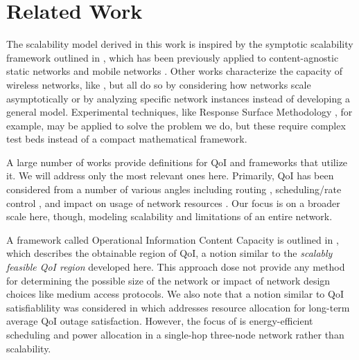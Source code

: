 \section{Related Work}
\label{sec:related_work}

The scalability model derived in this work is inspired by the symptotic scalability framework outlined in \cite{symptotics_journal}, which has been previously applied to content-agnostic static networks \cite{symptotics_framework_scalability} and mobile networks \cite{scal_analysis_mobility}.  Other works characterize the capacity of wireless networks, like \cite{li_capacity, gupta2000capacity}, but all do so by considering how networks scale asymptotically or by analyzing specific network instances instead of developing a general model.  Experimental techniques, like Response Surface Methodology \cite{khuri2010response}, for example, may be applied to solve the problem we do, but these require complex test beds instead of a compact mathematical framework.

A large number of works provide definitions for QoI and frameworks that utilize it.  We will address only the most relevant ones here.  Primarily, QoI has been considered from a number of various angles including routing \cite{quality_aware_routing_tan}, scheduling/rate control \cite{toward_qoi_rate_control,explor_vs_exploit}, and impact on usage of network resources \cite{qoi_aware_mobile_apps}. Our focus is on a broader scale here, though, modeling scalability and limitations of an entire network.


A framework called Operational Information Content Capacity is outlined in \cite{oicc_journal}, which describes the obtainable region of QoI, a notion similar to the \emph{scalably feasible QoI region} developed here.  This approach dose not provide any method for determining the possible size of the network or impact of network design choices like medium access protocols.  We also note that a notion similar to QoI satisfiablility was considered in \cite{qoi_outage} which addresses resource allocation for long-term average QoI outage satisfaction.  However, the focus of \cite{qoi_outage} is energy-efficient scheduling and power allocation in a single-hop three-node network rather than scalability.  

